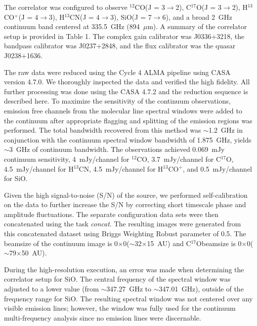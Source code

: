 \documentclass[preprint,12pt]{aastex62}
\newcommand{\htcn}{H$^{13}$CN}
\newcommand{\cso}{C$^{17}$O}
\newcommand{\htcop}{H$^{13}$CO$^+$}
\newcommand{\co}{$^{12}$CO}
\newcommand{\sio}{SiO}
\newcommand{\lco}{\co\space      (J = 3$\rightarrow$2)}   %
\newcommand{\lhtcn}{\htcn\space   (J = 4$\rightarrow$3)}   %
\newcommand{\lcso}{\cso\space    (J = 3$\rightarrow$2)}   %
\newcommand{\lhtcop}{\htcop\space (J = 4$\rightarrow$3)}   %
\newcommand{\lsio}{\sio\space    (J = 7$\rightarrow$6)}   %
\renewcommand{\micron}{$\mu$m}
\newcommand{\ab}{$\sim$}
\newcommand{\csobeam}{0\farcs21$\times$0\farcs13} %
\newcommand{\contbeam}{0\farcs11$\times$0\farcs05}
\begin{document}
The correlator was configured to observe \lco, \lcso, \lhtcop, \lhtcn, \lsio, and a broad 2~GHz continuum band centered at 335.5~GHz (894~\micron). A summary of the correlator setup is provided in Table 1. The complex gain calibrator was J0336$+$3218, the bandpass calibrator was J0237$+$2848, and the flux calibrator was the quasar J0238$+$1636. 

The raw data were reduced using the Cycle 4 ALMA pipeline using CASA \citep{2007ASPC..376..127M} version 4.7.0. We thoroughly inspected the data and verified the high fidelity. All further processing was done using the CASA 4.7.2 and the reduction sequence is described here. To maximize the sensitivity of the continuum observations, emission free channels from the molecular line spectral windows were added to the continuum after appropriate flagging and splitting of the emission regions was performed. The total bandwidth recovered from this method was \ab1.2~GHz in conjunction with the continuum spectral window bandwidth of 1.875~GHz, yields \ab3~GHz of continuum bandwidth. The observations achieved 0.069~mJy continuum sensitivity, 4~mJy/channel for \co, 3.7~mJy/channel for \cso, 4.5~mJy/channel for \htcn, 4.5~mJy/channel for \htcop, and 0.5~mJy/channel for \sio.

Given the high signal-to-noise (S/N) of the source, we performed self-calibration on the data to further increase the S/N by correcting short timescale phase and amplitude fluctuations. The separate configuration data sets were then concatenated using the task \textit{concat}. The resulting images were generated from this concatenated dataset using Briggs Weighting Robust parameter of 0.5. The beamsize of the continuum image is \contbeam\space (\ab32$\times$15~AU) and \cso\space beamsize is \csobeam\space (\ab79$\times$50~AU). 

During the high-resolution execution, an error was made when determining the correlator setup for SiO. The central frequency of the spectral window was adjusted to a lower value (from \ab347.27~GHz to \ab347.01~GHz), outside of the frequency range for SiO. The resulting spectral window was not centered over any visible emission lines; however, the window was fully used for the continuum multi-frequency analysis since no emission lines were discernable. 
    
\end{document}
